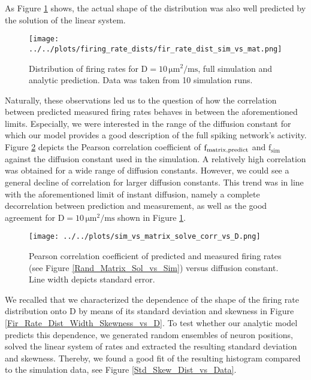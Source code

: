 \documentclass[10pt,a4paper]{article}
\begin{document}
As Figure \ref{Fir_Rate_Dist_Sim_vs_Mat} shows, the actual shape of the distribution was also well predicted by the solution of the linear system.
\begin{figure}
\begin{center}
\texttt{[image: ../../plots/firing\_rate\_dists/fir\_rate\_dist\_sim\_vs\_mat.png]}
\end{center}
\caption{Distribution of firing rates for $\mathrm{D=10\, \mu m^2 / ms}$, full simulation and analytic prediction. Data was taken from 10 simulation runs.}
\label{Fir_Rate_Dist_Sim_vs_Mat}
\end{figure}
Naturally, these observations led us to the question of how the correlation between predicted measured firing rates behaves in between the aforementioned limits. Especially, we were interested in the range of the diffusion constant for which our model provides a good description of the full spiking network's activity. Figure \ref{Corr_Coeff_vs_D} depicts the Pearson correlation coefficient of $\mathrm{f_{matrix \\, predict}}$ and $\mathrm{f_{sim}}$ against the diffusion constant used in the simulation. A relatively high correlation was obtained for a wide range of diffusion constants. However, we could see a general decline of correlation for larger diffusion constants. This trend was in line with the aforementioned limit of instant diffusion, namely a complete decorrelation between prediction and measurement, as well as the good agreement for $\mathrm{D= 10\, \mu m^2 / ms}$ shown in Figure \ref{Fir_Rate_Dist_Sim_vs_Mat}.
\begin{figure}
\begin{center}
\texttt{[image: ../../plots/sim\_vs\_matrix\_solve\_corr\_vs\_D.png]}
\end{center}
\caption{Pearson correlation coefficient of predicted and measured firing rates (see Figure \ref{Rand_Matrix_Sol_vs_Sim}) versus diffusion constant. Line width depicts standard error.}
\label{Corr_Coeff_vs_D}
\end{figure}
We recalled that we characterized the dependence of the shape of the firing rate distribution onto $\mathrm{D}$ by means of its standard deviation and skewness in Figure \ref{Fir_Rate_Dist_Width_Skewness_vs_D}. To test whether our analytic model predicts this dependence, we generated random ensembles of neuron positions, solved the linear system of rates and extracted the resulting standard deviation and skewness. Thereby, we found a good fit of the resulting histogram compared to the simulation data, see Figure \ref{Std_Skew_Dist_vs_Data}.
\end{document}
